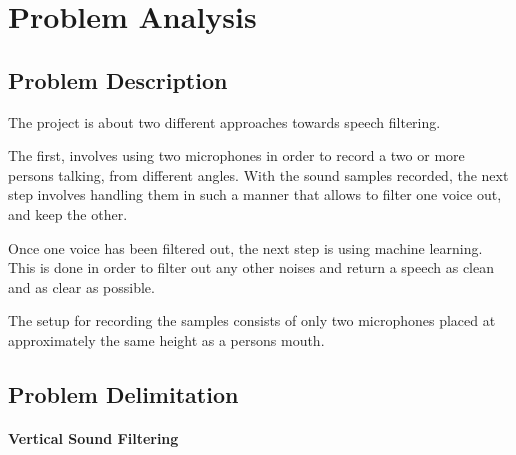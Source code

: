 \chapter{Problem Analysis}\label{ch:problemAnalysis}
\section{Problem Description}
The project is about two different approaches towards speech filtering.

The first, involves using two microphones in order to record a two or 
more persons talking, from different angles.
With the sound samples recorded, the next step involves handling them 
in such a manner that allows to filter one voice out, and keep the other.

Once one voice has been filtered out, the next step is using machine learning.
This is done in order to filter out any other noises and return a speech as clean
and as clear as possible.

The setup for recording the samples consists of only two microphones placed at
approximately the same height as a persons mouth.
\section{Problem Delimitation}
\subsubsection{Vertical Sound Filtering}
